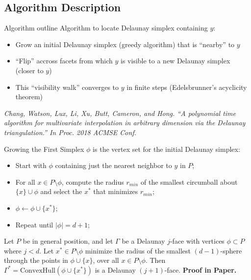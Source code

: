 \documentclass[aspectratio=169]{beamer}
\begin{document}
\subsection{Algorithm Description}
\begin{frame}{Algorithm outline}
Algorithm to locate Delaunay simplex containing $y$:
\begin{itemize}
\item Grow an initial Delaunay simplex (greedy algorithm) that is
``nearby'' to $y$
\item ``Flip'' accross facets from which $y$ is visible to a new Delaunay
simplex (closer to $y$)
\item This ``visibility walk'' converges to $y$ in finite steps
(Edelsbrunner's acyclicity theorem)
\end{itemize}
\vfill
{\tiny \it Chang, Watson, Lux, Li, Xu, Butt, Cameron, and Hong.
``A polynomial time algorithm for multivariate interpolation in arbitrary
dimension via the Delaunay triangulation.''
In Proc. 2018 ACMSE Conf.}
\end{frame}

\begin{frame}{Growing the First Simplex}
$\phi$ is the vertex set for the initial Delaunay simplex:
\begin{itemize}
\item Start with $\phi$ containing just the nearest neighbor to $y$ in
$P$;
\item For all $x \in P \setminus \phi$, compute the radius $r_{min}$ of
the smallest circumball about $\{x\} \cup \phi$ and select the $x^*$
that minimizes $r_{min}$;
\item $\phi \leftarrow \phi \cup \{x^*\}$;
\item Repeat until $|\phi| = d+1$;
\end{itemize}
\begin{lemma}
Let $P$ be in general position, and
let $\Gamma$ be a Delaunay $j$-face with vertices $\phi \subset P$
where $j<d$.
Let $x^* \in P \setminus \phi$
minimize the radius of the smallest $(d-1)$-sphere through the points in
$\phi \cup \{x\}$, over all $x \in P \setminus \phi$.
Then $\Gamma^* = \text{ConvexHull}(\phi \cup \{x^*\})$ is a Delaunay
$(j+1)$-face.
{\bf Proof in Paper.}
\end{lemma}
\end{frame}
\end{document}
